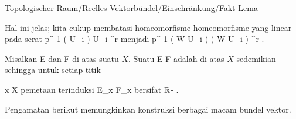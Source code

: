 {Topologischer Raum/Reelles Vektorbündel/Einschränkung/Fakt}
{Lema}
{}
{

\faktzusatz {}
\faktzusatz {}

}
{

Hal ini jelas; kita cukup membatasi homeomorfisme-homeomorfisme yang linear pada serat
 {p^{-1} \left(  U_i  \right) } { U_i \times \R^r
} {}
menjadi
 {p^{-1} \left(  W \cap U_i  \right) } { \left(  W \cap U_i  \right)  \times \R^r
} {}
.

}

{}
{

Misalkan
\mathkor {} {E} {dan} {F} {}
di atas suatu
$X$. Suatu
\maabb {\varphi} { E } { F
} {}
adalah
di atas $X$ sedemikian sehingga untuk setiap titik

\mavergleichskette
{\vergleichskette
{ x
}
{ \in }{ X
}
{  }{
}
{    }{
}
{   }{
}
}
{}{}{}
pemetaan terinduksi
 { E_x} {F_x
} {}
bersifat
${\mathbb R}$-
.

}

Pengamatan berikut memungkinkan konstruksi berbagai macam bundel vektor.

